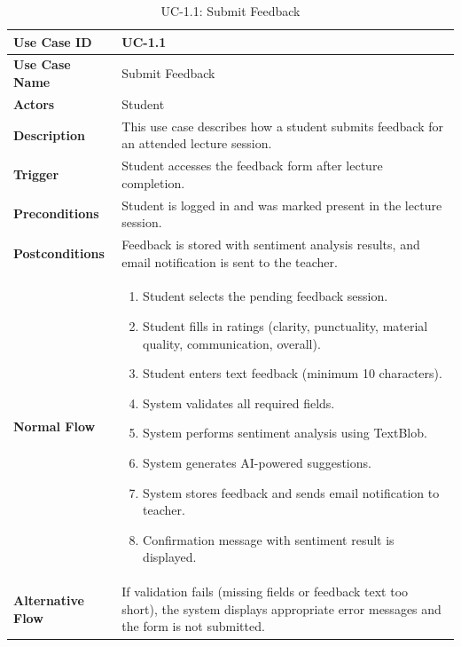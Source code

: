 \begin{table}[H]
\centering
\caption{UC-1.1: Submit Feedback}

\begin{tabularx}{\textwidth}{
|>{\raggedright\arraybackslash}p{3.5cm}
|>{\raggedright\arraybackslash}X|}

\hline
\textbf{Use Case ID} & UC-1.1 \\ \hline
\textbf{Use Case Name} & Submit Feedback \\ \hline
\textbf{Actors} & Student \\ \hline
\textbf{Description} & This use case describes how a student submits feedback for an attended lecture session. \\ \hline
\textbf{Trigger} & Student accesses the feedback form after lecture completion. \\ \hline
\textbf{Preconditions} & Student is logged in and was marked present in the lecture session. \\ \hline
\textbf{Postconditions} & Feedback is stored with sentiment analysis results, and email notification is sent to the teacher. \\ \hline
\textbf{Normal Flow} &
\begin{enumerate}
    \item Student selects the pending feedback session.
    \item Student fills in ratings (clarity, punctuality, material quality, communication, overall).
    \item Student enters text feedback (minimum 10 characters).
    \item System validates all required fields.
    \item System performs sentiment analysis using TextBlob.
    \item System generates AI-powered suggestions.
    \item System stores feedback and sends email notification to teacher.
    \item Confirmation message with sentiment result is displayed.
\end{enumerate}
\\ \hline
\textbf{Alternative Flow} &
If validation fails (missing fields or feedback text too short), the system displays appropriate error messages and the form is not submitted.
\\ \hline

\end{tabularx}

\end{table}


